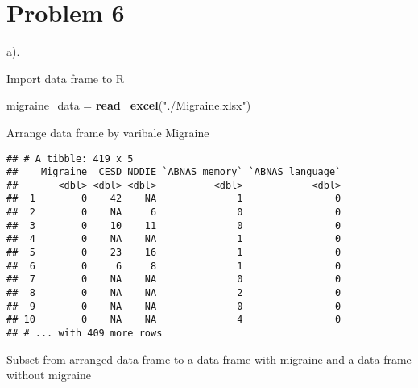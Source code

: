 \documentclass[]{article}
\newenvironment{Shaded}{\begin{snugshade}}{\end{snugshade}}
\newcommand{\KeywordTok}[1]{\textcolor[rgb]{0.13,0.29,0.53}{\textbf{#1}}}
\newcommand{\DecValTok}[1]{\textcolor[rgb]{0.00,0.00,0.81}{#1}}
\newcommand{\StringTok}[1]{\textcolor[rgb]{0.31,0.60,0.02}{#1}}
\newcommand{\OperatorTok}[1]{\textcolor[rgb]{0.81,0.36,0.00}{\textbf{#1}}}
\newcommand{\NormalTok}[1]{#1}
\begin{document}
\section{Problem 6}\label{problem-6}

a).

Import data frame to R

\begin{Shaded}
\begin{Highlighting}[]
\NormalTok{migraine_data =}\StringTok{ }\KeywordTok{read_excel}\NormalTok{(}\StringTok{"./Migraine.xlsx"}\NormalTok{)}
\end{Highlighting}
\end{Shaded}

Arrange data frame by varibale Migraine

\begin{Shaded}
\end{Shaded}

\begin{verbatim}
## # A tibble: 419 x 5
##    Migraine  CESD NDDIE `ABNAS memory` `ABNAS language`
##       <dbl> <dbl> <dbl>          <dbl>            <dbl>
##  1        0    42    NA              1                0
##  2        0    NA     6              0                0
##  3        0    10    11              0                0
##  4        0    NA    NA              1                0
##  5        0    23    16              1                0
##  6        0     6     8              1                0
##  7        0    NA    NA              0                0
##  8        0    NA    NA              2                0
##  9        0    NA    NA              0                0
## 10        0    NA    NA              4                0
## # ... with 409 more rows
\end{verbatim}

Subset from arranged data frame to a data frame with migraine and a data
frame without migraine

\begin{Shaded}
\end{Shaded}
\end{document}

